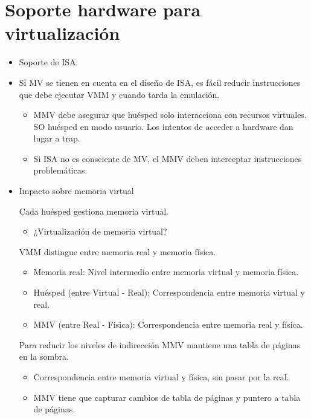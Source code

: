 \documentclass[12pt, twoside, openright]{report} %
\begin{document}
\section{Soporte hardware para virtualización}

\begin{itemize}
	\item Soporte de ISA:
	\item Si MV se tienen en cuenta en el diseño de ISA, es fácil reducir
	      instrucciones que debe ejecutar VMM y cuando tarda la emulación.

	      \begin{itemize}

		      \item MMV debe asegurar que huésped solo interacciona con recursos
		            virtuales. SO huésped en modo usuario. Los intentos de acceder a
		            hardware dan lugar a trap.
		      \item Si ISA no es consciente de MV, el MMV deben interceptar
		            instrucciones problemáticas.
	      \end{itemize}
	\item Impacto sobre memoria virtual

	      Cada huésped gestiona memoria virtual.
	      \begin{itemize}
		      \item ¿Virtualización de memoria virtual?

	      \end{itemize}
	      VMM distingue entre memoria real y memoria física.
	      \begin{itemize}
		      \item Memoria real: Nivel intermedio entre memoria virtual y memoria física.
		      \item Huésped (entre Virtual - Real): Correspondencia entre memoria virtual y real.
		      \item MMV (entre Real - Fisica): Correspondencia entre memoria real y física.
	      \end{itemize}
	      Para reducir los niveles de indirección MMV mantiene una
	      tabla de páginas en la sombra.
	      \begin{itemize}
		      \item Correspondencia entre memoria virtual y física, sin pasar por la real.
		      \item MMV tiene que capturar cambios de tabla de páginas y puntero a tabla de páginas.
	      \end{itemize}


\end{itemize}
\end{document}
